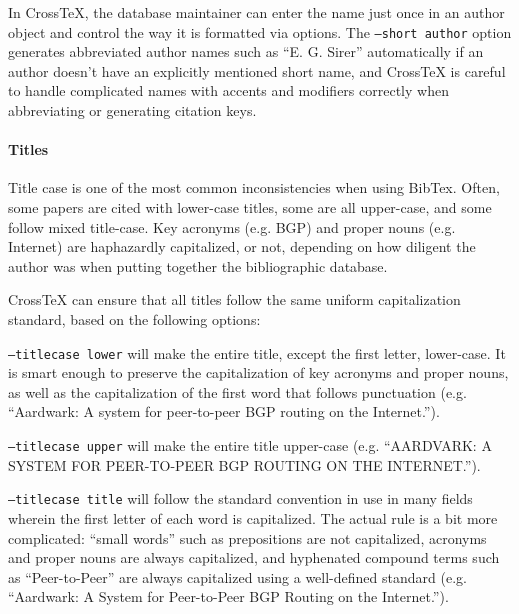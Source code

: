 \documentclass{article}
\newcommand{\XTeX}{Cross\TeX}
\begin{document}
In \XTeX{}, the database maintainer can enter the name just once in an
author object and control the way it is formatted via options. The
\texttt{--short author} option generates abbreviated author names such
as ``E. G. Sirer'' automatically if an author doesn't have an
explicitly mentioned short name, and \XTeX{} is careful to handle
complicated names with accents and modifiers correctly when
abbreviating or generating citation keys. 

\paragraph{Titles}

Title case is one of the most common inconsistencies when using
BibTex. Often, some papers are cited with lower-case titles, some are
all upper-case, and some follow mixed title-case. Key acronyms
(e.g. BGP) and proper nouns (e.g. Internet) are haphazardly
capitalized, or not, depending on how diligent the author was when
putting together the bibliographic database.

\XTeX{} can ensure that all titles follow the same uniform capitalization
standard, based on the following options:

\begin{description}

\item\texttt{--titlecase lower} will make the entire title, except the first letter,
lower-case. It is smart enough to preserve the capitalization of key acronyms 
and proper nouns, as well as the capitalization of the first word that follows
punctuation (e.g. ``Aardwark: A system for peer-to-peer BGP routing on the Internet.'').


\item\texttt{--titlecase upper} will make the entire title upper-case
(e.g. ``AARDVARK: A SYSTEM FOR PEER-TO-PEER BGP ROUTING ON THE INTERNET.'').

\item\texttt{--titlecase title} will follow the standard convention in use
in many fields wherein the first letter of each word is capitalized. The 
actual rule is a bit more complicated: ``small words'' such as prepositions 
are not capitalized, acronyms and proper nouns are always capitalized, and
hyphenated compound terms such as ``Peer-to-Peer'' are always capitalized
using a well-defined standard (e.g. ``Aardwark: A System for Peer-to-Peer BGP Routing on the Internet.'').

\end{description}
\end{document}
